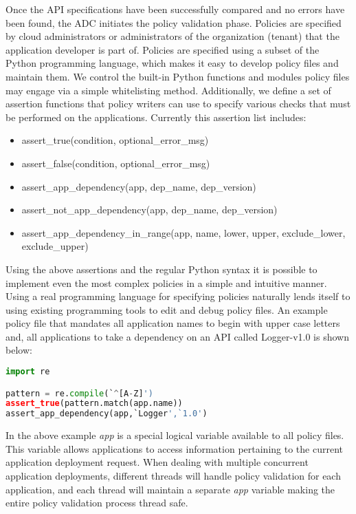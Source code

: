 Once the API specifications have been successfully compared and no errors have been found, the ADC initiates the policy validation phase. Policies
are specified by cloud administrators or administrators of the organization (tenant) that the application developer is part of. Policies are specified using
a subset of the Python programming language, which makes it easy to develop policy files and maintain them. We control the built-in Python functions and
modules policy files may engage via a simple whitelisting method. Additionally, we define a set of assertion functions that policy writers can use to specify
various checks that must be performed on the applications. Currently this assertion list includes:

\begin{itemize}
\item assert\_true(condition, optional\_error\_msg)
\item assert\_false(condition, optional\_error\_msg)
\item assert\_app\_dependency(app, dep\_name, dep\_version)
\item assert\_not\_app\_dependency(app, dep\_name, dep\_version)
\item assert\_app\_dependency\_in\_range(app, name, lower, upper, exclude\_lower, exclude\_upper)
\end{itemize}

Using the above assertions and the regular Python syntax it is possible to implement even the most complex policies in a simple and intuitive manner.
Using a real programming language for specifying policies naturally lends itself to using existing programming tools to edit and debug policy files. An example
policy file that mandates all application names to begin with upper case letters and, all applications to take a dependency on an API called Logger-v1.0
is shown below:

\begin{lstlisting}[language=Python, frame=single]
import re

pattern = re.compile(`^[A-Z]')
assert_true(pattern.match(app.name))
assert_app_dependency(app,`Logger',`1.0')
\end{lstlisting}

In the above example \textit{app} is a special logical variable available to all policy files. This variable allows applications to access information pertaining
to the current application deployment request. When dealing with multiple concurrent application deployments, different threads will handle policy validation
for each application, and each thread will maintain a separate \textit{app} variable making the entire policy validation process thread safe.

